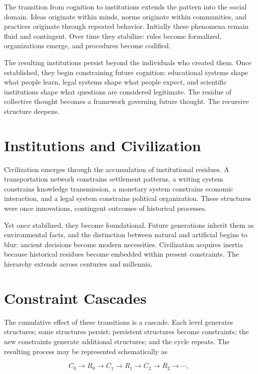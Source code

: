 \documentclass[11pt,oneside]{book}
\theoremstyle{plain}
\theoremstyle{definition}
\theoremstyle{remark}
\begin{document}
The transition from cognition to institutions extends the pattern into the social domain. Ideas originate within minds, norms originate within communities, and practices originate through repeated behavior. Initially these phenomena remain fluid and contingent. Over time they stabilize: rules become formalized, organizations emerge, and procedures become codified.

The resulting institutions persist beyond the individuals who created them. Once established, they begin constraining future cognition: educational systems shape what people learn, legal systems shape what people expect, and scientific institutions shape what questions are considered legitimate. The residue of collective thought becomes a framework governing future thought. The recursive structure deepens.

\section{Institutions and Civilization}

Civilization emerges through the accumulation of institutional residues. A transportation network constrains settlement patterns, a writing system constrains knowledge transmission, a monetary system constrains economic interaction, and a legal system constrains political organization. These structures were once innovations, contingent outcomes of historical processes.

Yet once stabilized, they become foundational. Future generations inherit them as environmental facts, and the distinction between natural and artificial begins to blur: ancient decisions become modern necessities. Civilization acquires inertia because historical residues become embedded within present constraints. The hierarchy extends across centuries and millennia.

\section{Constraint Cascades}

The cumulative effect of these transitions is a cascade. Each level generates structures; some structures persist; persistent structures become constraints; the new constraints generate additional structures; and the cycle repeats. The resulting process may be represented schematically as

\begin{equation}
C_0
\rightarrow
R_0
\rightarrow
C_1
\rightarrow
R_1
\rightarrow
C_2
\rightarrow
R_2
\rightarrow
\cdots,
\end{equation}
\end{document}
